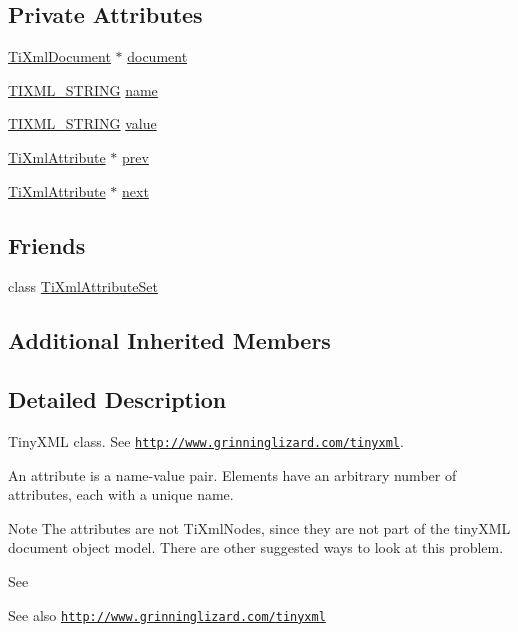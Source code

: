 \subsection*{Private Attributes}
\begin{DoxyCompactItemize}
\item 
\hyperlink{class_ti_xml_document}{Ti\+Xml\+Document} $\ast$ \hyperlink{class_ti_xml_attribute_ada41d3cff50cd33a78072806f88d4433}{document}
\item 
\hyperlink{tinyxml_8h_a92bada05fd84d9a0c9a5bbe53de26887}{T\+I\+X\+M\+L\+\_\+\+S\+T\+R\+I\+NG} \hyperlink{class_ti_xml_attribute_afcbe165f33f08cf9b24daa33f0ee951a}{name}
\item 
\hyperlink{tinyxml_8h_a92bada05fd84d9a0c9a5bbe53de26887}{T\+I\+X\+M\+L\+\_\+\+S\+T\+R\+I\+NG} \hyperlink{class_ti_xml_attribute_ae9e4e5f442347434b1da43954cc1b411}{value}
\item 
\hyperlink{class_ti_xml_attribute}{Ti\+Xml\+Attribute} $\ast$ \hyperlink{class_ti_xml_attribute_aaf6c6272c625fbf38e571cbf570ea94a}{prev}
\item 
\hyperlink{class_ti_xml_attribute}{Ti\+Xml\+Attribute} $\ast$ \hyperlink{class_ti_xml_attribute_ae851adf61b80cf45b797fee77dea135f}{next}
\end{DoxyCompactItemize}
\subsection*{Friends}
\begin{DoxyCompactItemize}
\item 
class \hyperlink{class_ti_xml_attribute_a35a7b7f89f708527677d5078d41ce0bf}{Ti\+Xml\+Attribute\+Set}
\end{DoxyCompactItemize}
\subsection*{Additional Inherited Members}


\subsection{Detailed Description}
Tiny\+X\+ML class. See \href{http://www.grinninglizard.com/tinyxml}{\tt http\+://www.\+grinninglizard.\+com/tinyxml}. 

An attribute is a name-\/value pair. Elements have an arbitrary number of attributes, each with a unique name.

\begin{DoxyNote}{Note}
The attributes are not Ti\+Xml\+Nodes, since they are not part of the tiny\+X\+ML document object model. There are other suggested ways to look at this problem.
\end{DoxyNote}
See \begin{DoxySeeAlso}{See also}
\href{http://www.grinninglizard.com/tinyxml}{\tt http\+://www.\+grinninglizard.\+com/tinyxml} 
\end{DoxySeeAlso}


